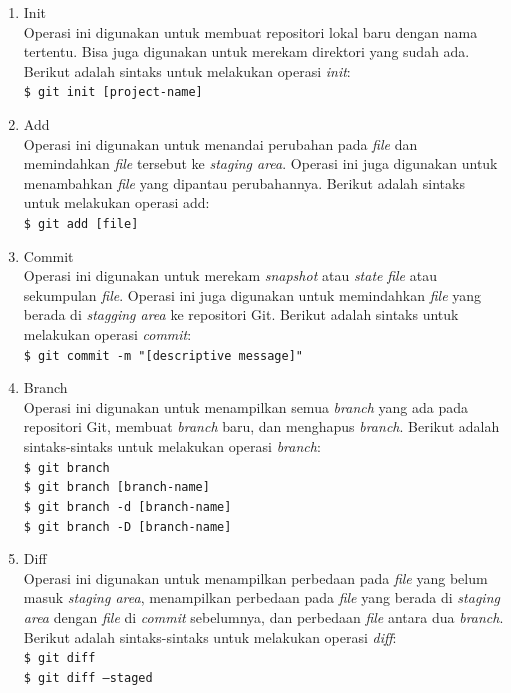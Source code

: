 \begin{enumerate}
\item Init\\
Operasi ini digunakan untuk membuat repositori lokal baru dengan nama tertentu. Bisa juga digunakan untuk merekam direktori yang sudah ada. Berikut adalah sintaks untuk melakukan operasi  \textit{init}:\\
\texttt{\$ git init [project-name]}  
\item Add\\
Operasi ini digunakan untuk menandai perubahan pada \textit{file} dan memindahkan \textit{file} tersebut ke \textit{staging area}. Operasi ini juga digunakan untuk menambahkan \textit{file} yang dipantau perubahannya. Berikut adalah sintaks untuk melakukan operasi add:\\
\texttt{\$ git add [file]}  
\item Commit\\
Operasi ini digunakan untuk merekam \textit{snapshot} atau \textit{state} \textit{file} atau sekumpulan \textit{file}. Operasi ini juga digunakan untuk memindahkan \textit{file} yang berada di \textit{stagging area} ke repositori Git. Berikut adalah sintaks untuk melakukan operasi \textit{commit}:\\
\texttt{\$ git commit -m "[descriptive message]"}  
\item Branch\\
Operasi ini digunakan untuk menampilkan semua \textit{branch} yang ada pada repositori Git, membuat \textit{branch} baru, dan menghapus \textit{branch}. Berikut adalah sintaks-sintaks untuk melakukan operasi \textit{branch}:\\
\texttt{\$ git branch}\\ 
\texttt{\$ git branch [branch-name]}\\
\texttt{\$ git branch -d [branch-name]}\\
\texttt{\$ git branch -D [branch-name]} 
\item Diff\\
Operasi ini digunakan untuk menampilkan perbedaan pada \textit{file} yang belum masuk \textit{staging area}, menampilkan perbedaan pada \textit{file} yang berada di \textit{staging area} dengan \textit{file} di \textit{commit} sebelumnya, dan perbedaan \textit{file} antara dua \textit{branch}.  Berikut adalah sintaks-sintaks untuk melakukan operasi \textit{diff}:\\
\texttt{\$ git diff} \\
\texttt{\$ git diff --staged}\\

\end{enumerate}
